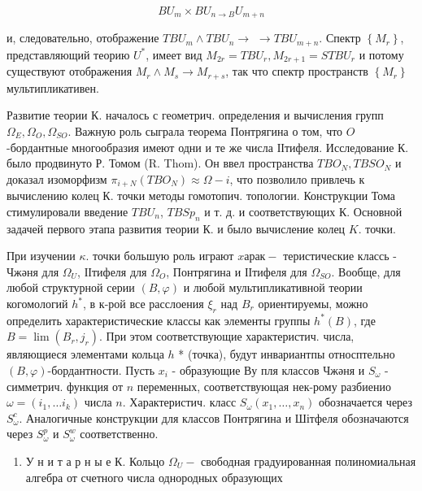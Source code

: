 \documentclass[10pt]{article}
\begin{document}
\[

B U_{m} \times B U_{n \rightarrow B} U_{m+n}

\]



и, следовательно, отображение $T B U_{m} \wedge T B U_{n} \rightarrow$ $\rightarrow T B U_{m+n}$. Спектр $\left\{M_{r}\right\}$, представляющий теорию $U^{*}$, имеет вид $M_{2 r}=T B U_{r}, M_{2 r+1}=S T B U_{r}$ и потому существуют отображения $M_{r} \wedge M_{s} \rightarrow M_{r+s}$, так что спектр пространств $\left\{M_{r}\right\}$ мультипликативен.



Развитие теории К. началось с геометрич. определения и вычисления групп $\Omega_{E}, \Omega_{O}, \Omega_{S O}$. Важную роль сыграла теорема Понтрягина о том, что $O$-бордантные многообразия имеют одни и те же числа ІІтифеля. Исследование К. было продвинуто Р. Томом (R. Thom). Он ввел пространства $T B O_{N}, T B S O_{N}$ и доказал изоморфизм $\pi_{i+N}\left(T B O_{N}\right) \approx \Omega-i$, что позволило привлечь к вычислению колец К. точки методы гомотопич. топологии. Конструкции Тома стимулировали введение $T B U_{n}$, $T B S p_{n}$ и т. д. и соответствующих К. Основной задачей первого этапа развития теории К. и было вычисление колец $K$. точки.



При изучении $\kappa$. точки большую роль играют $x а р а к-$ теристические классь - Чжәня для $\Omega_{U}$, ІІтифеля для $\Omega_{O}$, Понтрягина и ІІтифеля для $\Omega_{S O}$. Вообще, для любой структурной серии $(B, \varphi)$ и любой мультипликативной теории когомологий $h^{*}$, в к-рой все расслоения $\xi_{r}$ над $B_{r}$ ориентируемы, можно определить характеристические классы как элементы группы $h^{*}(B)$, где $B=\lim \left(B_{r}, j_{r}\right)$. При этом соответствующие характеристич. числа, являющиеся элементами кольца $h$ * (точка), будут инвариантпы относптельно $(B, \varphi)$-бордантности. Пусть $x_{i}$ - образующие Ву пля классов Чжәня и $S_{\omega}$ - симметрич. функция от $n$ переменных, соответствующая нек-рому разбиенио $\omega=\left(i_{1}, \ldots i_{k}\right)$ числа $n$. Характеристич. класс $S_{\omega}\left(x_{1}, \ldots, x_{n}\right)$ обозначается через $S_{\omega}^{c}$. Аналогичные конструкции для классов Понтрягина и Шітфеля обозначаются через $S_{\omega}^{p}$ и $S_{\omega}^{w}$ соответственно.



\begin{enumerate}

  \item У н и т а р н ы е К. Кольцо $\Omega_{U}-$ свободная градуированная полиномиальная алгебра от счетного числа однородных образующих

\end{enumerate}
\end{document}
